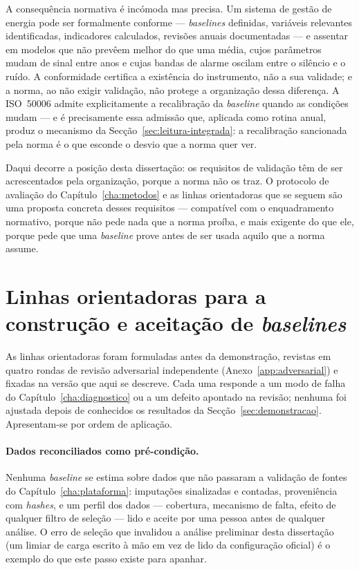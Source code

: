 A consequência normativa é incómoda mas precisa. Um sistema de gestão de
energia pode ser formalmente conforme --- \emph{baselines} definidas,
variáveis relevantes identificadas, indicadores calculados, revisões
anuais documentadas --- e assentar em modelos que não prevêem melhor do que
uma média, cujos parâmetros mudam de sinal entre anos e cujas bandas de
alarme oscilam entre o silêncio e o ruído. A conformidade certifica a
existência do instrumento, não a sua validade; e a norma, ao não exigir
validação, não protege a organização dessa diferença. A ISO~50006 admite
explicitamente a recalibração da \emph{baseline} quando as condições mudam
--- e é precisamente essa admissão que, aplicada como rotina anual, produz o
mecanismo da Secção~\ref{sec:leitura-integrada}: a recalibração sancionada
pela norma é o que esconde o desvio que a norma quer ver.

Daqui decorre a posição desta dissertação: os requisitos de validação têm
de ser acrescentados pela organização, porque a norma não os traz. O
protocolo de avaliação do Capítulo~\ref{cha:metodos} e as linhas
orientadoras que se seguem são uma proposta concreta desses requisitos ---
compatível com o enquadramento normativo, porque não pede nada que a norma
proíba, e mais exigente do que ele, porque pede que uma \emph{baseline} prove
antes de ser usada aquilo que a norma assume.

\section{Linhas orientadoras para a construção e aceitação de \emph{baselines}}
\label{sec:guidelines}

As linhas orientadoras foram formuladas antes da demonstração, revistas em
quatro rondas de revisão adversarial independente (Anexo~\ref{app:adversarial})
e fixadas na versão que aqui se descreve. Cada uma responde a um modo de
falha do Capítulo~\ref{cha:diagnostico} ou a um defeito apontado na revisão;
nenhuma foi ajustada depois de conhecidos os resultados da
Secção~\ref{sec:demonstracao}. Apresentam-se por ordem de aplicação.

\paragraph{Dados reconciliados como pré-condição.} Nenhuma \emph{baseline} se
estima sobre dados que não passaram a validação de fontes do
Capítulo~\ref{cha:plataforma}: imputações sinalizadas e contadas,
proveniência com \emph{hashes}, e um perfil dos dados --- cobertura,
mecanismo de falta, efeito de qualquer filtro de seleção --- lido e aceite
por uma pessoa antes de qualquer análise. O erro de seleção que invalidou a
análise preliminar desta dissertação (um limiar de carga escrito à mão em vez
de lido da configuração oficial) é o exemplo do que este passo existe para
apanhar.

